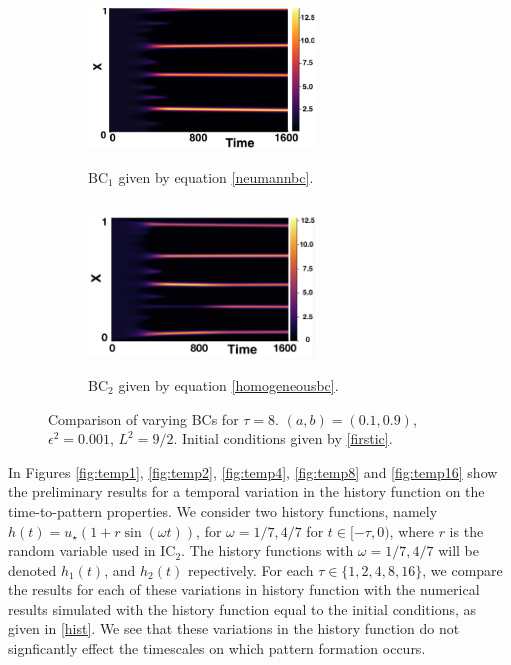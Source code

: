 \begin{figure}[H]
    \centering
    \begin{subfigure}[t]{0.45\textwidth}
        \centering
        \includegraphics[width=6cm,height=4.5cm]{ic28.png}
        \caption{$\text{BC}_1$ given by equation \eqref{neumannbc}.}
        \label{}
    \end{subfigure}
    \hfill
    \begin{subfigure}[t]{0.45\textwidth}
        \centering
        \includegraphics[width=6cm,height=4.5cm]{bc8.png}
        \caption{$\text{BC}_2$ given by equation \eqref{homogeneousbc}.}
        \label{}
    \end{subfigure}
    \caption{Comparison of varying BCs for $\tau=8$. $(a,b)=(0.1,0.9)$, $\epsilon^2=0.001$, $L^2=9/2$. Initial conditions given by \eqref{firstic}.}
    \label{fig:Bbc8}
\end{figure}

In Figures \ref{fig:temp1}, \ref{fig:temp2}, \ref{fig:temp4}, \ref{fig:temp8} and \ref{fig:temp16} show the preliminary results for a temporal variation in the history function on the time-to-pattern properties. We consider two history functions, namely $h(t)=u_\star(1+r\sin(\omega t))$, for $\omega=1/7,4/7$ for $t\in[-\tau,0)$, where $r$ is the random variable used in $\text{IC}_2$. The history functions with $\omega=1/7,4/7$ will be denoted $h_1(t)$, and $h_2(t)$ repectively. For each $\tau\in\{1,2,4,8,16\}$, we compare the results for each of these variations in history function with the numerical results simulated with the history function equal to the initial conditions, as given in \eqref{hist}. We see that these variations in the history function do not signficantly effect the timescales on which pattern formation occurs.

